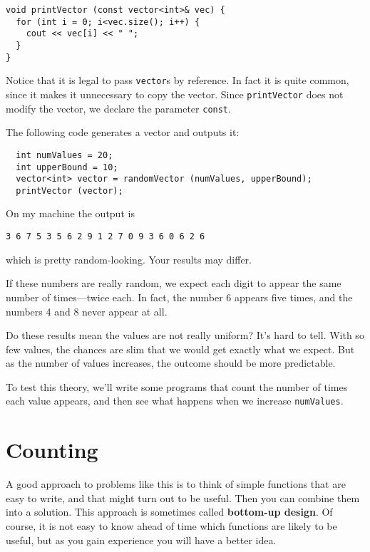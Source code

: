 \begin{verbatim}
void printVector (const vector<int>& vec) {
  for (int i = 0; i<vec.size(); i++) {
    cout << vec[i] << " ";
  }
}
\end{verbatim}
%
Notice that it is legal to pass {\tt vector}s by reference.
In fact it is quite common, since it makes it unnecessary to
copy the vector.  Since {\tt printVector} does not modify the
vector, we declare the parameter {\tt const}.

The following code generates a vector and outputs it:

\begin{verbatim}
  int numValues = 20;
  int upperBound = 10;
  vector<int> vector = randomVector (numValues, upperBound);
  printVector (vector);
\end{verbatim}
%
On my machine the output is

\begin{verbatim}
3 6 7 5 3 5 6 2 9 1 2 7 0 9 3 6 0 6 2 6 
\end{verbatim}
%
which is pretty random-looking.  Your results may differ.

If these numbers are really random,
we expect each digit to appear the same number of times---twice
each.  In fact, the number 6 appears five times, and the numbers 4
and 8 never appear at all.

Do these results mean the values are not really uniform?  It's
hard to tell.  With so few values, the chances are slim
that we would get exactly what we expect.  But as the number
of values increases, the outcome should be more predictable.

To test this theory, we'll write some programs that count the
number of times each value appears, and then see what happens
when we increase {\tt numValues}.

\section{Counting}
\label{counting}

A good approach to problems like this is to think of simple functions
that are easy to write, and that might turn out to be useful.  Then
you can combine them into a solution.  This approach is sometimes
called {\bf bottom-up design}.  Of course, it is not easy to
know ahead of time which functions are likely to be useful, but as you
gain experience you will have a better idea.

